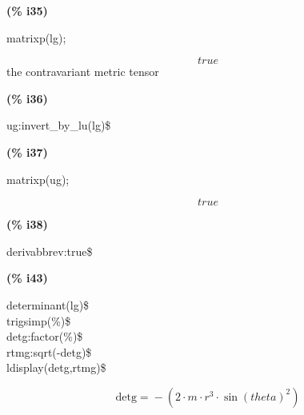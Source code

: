 \documentclass[fleqn]{article}
\begin{document}
\noindent
\begin{minipage}[t]{4.000000em}\color{red}\bfseries
(\% i35)	
\end{minipage}
\begin{minipage}[t]{\textwidth}\color{blue}
matrixp(lg);
\end{minipage}
\[\displaystyle \tag{\% o35} 
true\mbox{}
\]
the contravariant metric tensor


\noindent
\begin{minipage}[t]{4.000000em}\color{red}\bfseries
(\% i36)	
\end{minipage}
\begin{minipage}[t]{\textwidth}\color{blue}
ug:invert\_by\_lu(lg)\$
\end{minipage}

\noindent%



\noindent
\begin{minipage}[t]{4.000000em}\color{red}\bfseries
(\% i37)	
\end{minipage}
\begin{minipage}[t]{\textwidth}\color{blue}
matrixp(ug);
\end{minipage}
\[\displaystyle \tag{\% o37} 
true\mbox{}
\]


\noindent
\begin{minipage}[t]{4.000000em}\color{red}\bfseries
(\% i38)	
\end{minipage}
\begin{minipage}[t]{\textwidth}\color{blue}
derivabbrev:true\$
\end{minipage}

\noindent%



\noindent
\begin{minipage}[t]{4.000000em}\color{red}\bfseries
(\% i43)	
\end{minipage}
\begin{minipage}[t]{\textwidth}\color{blue}
determinant(lg)\$\\
trigsimp(\%)\$\\
detg:factor(\%)\$\\
rtmg:sqrt(-detg)\$\\
ldisplay(detg,rtmg)\$
\end{minipage}
\[\displaystyle \tag{\% t43} 
\ensuremath{\mathrm{detg}}\mathop{=}\mathop{-}\left( 2\mathop{\ensuremath{\cdot}}m\mathop{\ensuremath{\cdot}}{{r}^{3}}\mathop{\ensuremath{\cdot}}{{\sin{(theta)}}^{2}}\right) \mbox{}\]
\end{document}
